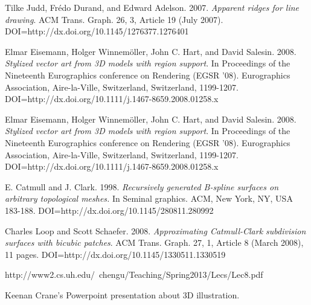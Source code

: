 \documentclass[12pt, letterpaper]{article}
\begin{document}
\begin{thebibliography}{9}

Tilke Judd, Frédo Durand, and Edward Adelson. 2007. 
\emph{Apparent ridges for line drawing}. ACM Trans. Graph. 26, 3, Article 19 (July 2007). DOI=http://dx.doi.org/10.1145/1276377.1276401

Elmar Eisemann, Holger Winnemöller, John C. Hart, and David Salesin. 2008.
\emph{Stylized vector art from 3D models with region support}. In Proceedings of the Nineteenth Eurographics conference on Rendering (EGSR '08). Eurographics Association, Aire-la-Ville, Switzerland, Switzerland, 1199-1207. DOI=http://dx.doi.org/10.1111/j.1467-8659.2008.01258.x

Elmar Eisemann, Holger Winnemöller, John C. Hart, and David Salesin. 2008.
\emph{Stylized vector art from 3D models with region support}. In Proceedings of the Nineteenth Eurographics conference on Rendering (EGSR '08). Eurographics Association, Aire-la-Ville, Switzerland, Switzerland, 1199-1207. DOI=http://dx.doi.org/10.1111/j.1467-8659.2008.01258.x

E. Catmull and J. Clark. 1998. \emph{Recursively generated B-spline surfaces on arbitrary topological meshes.}
In Seminal graphics. ACM, New York, NY, USA 183-188. DOI=http://dx.doi.org/10.1145/280811.280992

Charles Loop and Scott Schaefer. 2008.
\emph{Approximating Catmull-Clark subdivision surfaces with bicubic patches}.
ACM Trans. Graph. 27, 1, Article 8 (March 2008), 11 pages. DOI=http://dx.doi.org/10.1145/1330511.1330519

http://www2.cs.uh.edu/~chengu/Teaching/Spring2013/Lecs/Lec8.pdf

Keenan Crane's Powerpoint presentation about 3D illustration.

\end{thebibliography}
\end{document}
